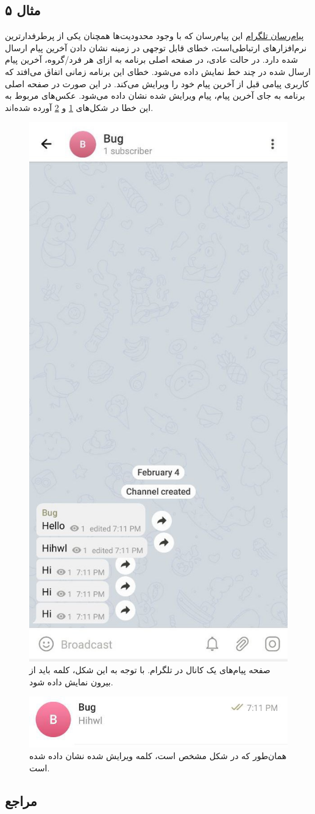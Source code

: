 {\subsection*{مثال ۵}
\href{https://telegram.org/}{پیام‌رسان تلگرام}
این پیام‌رسان که با وجود محدودیت‌ها همچنان یکی از پرطرفدارترین نرم‌افزارهای ارتباطی‌است، خطای قابل توجهی در زمینه نشان دادن آخرین پیام ارسال شده دارد. در حالت عادی، در صفحه اصلی برنامه به ازای هر فرد/گروه، آخرین پیام ارسال شده در چند خط نمایش داده می‌شود. خطای این برنامه زمانی اتفاق می‌افتد که کاربری پیامی قبل از آخرین پیام خود را ویرایش می‌کند. در این صورت در صفحه اصلی برنامه به جای آخرین پیام، پیام ویرایش شده نشان داده می‌شود. عکس‌های مربوط به این خطا در شکل‌های \ref{fig:bug5} و \ref{fig:bug6} آورده شده‌‌اند.

\begin{figure}[H]
	\centering
	\includegraphics[width=0.25\linewidth]{figs/bug5.jpg}
	\caption{صفحه پیام‌های یک کانال در تلگرام. با توجه به این شکل، کلمه  باید از بیرون نمایش داده شود.}
	\label{fig:bug5}
\end{figure}

\begin{figure}[H]
	\centering
	\includegraphics[width=0.7\linewidth]{figs/bug6.jpg}
	\caption{همان‌طور که در شکل مشخص است، کلمه ویرایش شده  نشان داده شده است.}
	\label{fig:bug6}
\end{figure}

\subsection*{مراجع}

\begin{latin}
	\begingroup
	\renewcommand{\section}[2]{}%
	

\end{latin}}
